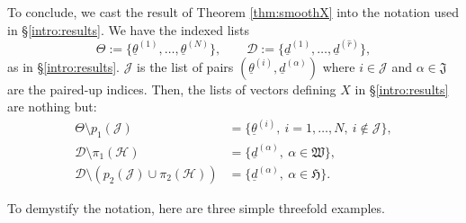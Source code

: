 \documentclass[12pt,a4paper,oneside]{amsart}
\numberwithin{equation}{section}
\theoremstyle{definition}
\theoremstyle{remark}
\begin{document}
To conclude, we cast the result of Theorem \ref{thm:smoothX} into the notation used in \S\ref{intro:results}. We have the indexed lists 
\begin{equation*}
\Theta:=\{ \underline{\theta}^{(1)},\ldots,\underline{\theta}^{(N)}\},\qquad \mathcal{D}:=\{\underline{d}^{(1)},\ldots,\underline{d}^{(\hat{r})}\} ,
\end{equation*}
as in \S\ref{intro:results}. $\mathscr{J}$ is the list of pairs $\left( \underline{\theta}^{(i)}, \underline{d}^{(\alpha)} \right) $ where $i \in \mathcal{J}$ and $\alpha \in \mathfrak{J}$ are the paired-up indices. Then, the lists of vectors defining $X$ in \S\ref{intro:results} are nothing but:
\begin{align*}
    \Theta \setminus p_1 (\mathscr{J}) &=\{ \underline{\theta}^{(i)} , \ i =1, \dots, N , \ i \notin \mathcal{J}\} , \\
    \mathcal{D} \setminus \pi_1 (\mathscr{H}) &=\{ \underline{d}^{(\alpha)} , \ \alpha \in \mathfrak{W}\} , \\
    \mathcal{D} \setminus \left( p_2 (\mathscr{J})  \cup \pi_2 (\mathscr{H})\right) &=\{ \underline{d}^{(\alpha)} , \ \alpha \in \mathfrak{H}\} .
\end{align*}\par
To demystify the notation, here are three simple threefold examples. 
\end{document}
